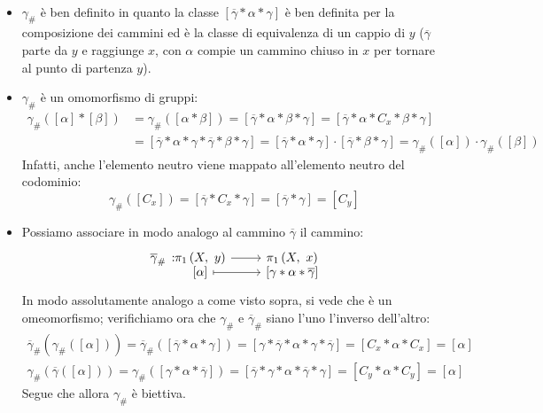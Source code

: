 \begin{demonstration}~{}
	\begin{itemize}
		\item $\gamma_{\#}$ è ben definito in quanto la classe $\left[\overline{\gamma}\ast\alpha\ast\gamma\right]$ è ben definita per la composizione dei cammini ed è la classe di equivalenza di un cappio di $y$ ($\overline{\gamma}$ parte da $y$ e raggiunge $x$, con $\alpha$ compie un cammino chiuso in $x$ per tornare al punto di partenza $y$).
		\item $\gamma_{\#}$ è un omomorfismo di gruppi:
		\begin{equation*}
			\begin{array}{lll}
				\gamma_{\#}\left(\left[\alpha\right]\ast\left[\beta\right]\right)&=\gamma_{\#}\left(\left[\alpha\ast\beta\right]\right)=\left[\overline{\gamma}\ast\alpha\ast\beta\ast\gamma\right]=\left[\overline{\gamma}\ast\alpha\ast C_x\ast\beta\ast\gamma\right]\\
				&=\left[\overline{\gamma}\ast\alpha\ast \gamma\ast\overline{\gamma}\ast\beta\ast\gamma\right]=\left[\overline{\gamma}\ast\alpha\ast\gamma\right]\cdot\left[\overline{\gamma}\ast\beta\ast\gamma\right]=\gamma_{\#}\left(\left[\alpha\right]\right)\cdot \gamma_{\#}\left(\left[\beta\right]\right)
			\end{array}
		\end{equation*}
	Infatti, anche l'elemento neutro viene mappato all'elemento neutro del codominio:
	\begin{equation*}
		\gamma_{\#}\left(\left[C_x\right]\right)=\left[\overline{\gamma}\ast C_x\ast\gamma\right]=\left[\overline{\gamma}\ast\gamma\right]=\left[C_y\right]
	\end{equation*}
	\item Possiamo associare in modo analogo al cammino $\overline{\gamma}$ il cammino:
	\begin{equation*}
		\funztot{\overline{\gamma}_{\#}}{\gruf{X}{y}}{\gruf{X}{x}}{\left[\alpha\right]}{\left[\gamma\ast\alpha\ast\overline{\gamma}\right]}
	\end{equation*}
In modo assolutamente analogo a come visto sopra, si vede che è un omeomorfismo; verifichiamo ora che $\gamma_{\#}$ e $\overline{\gamma}_{\#}$ siano l'uno l'inverso dell'altro:
\begin{gather*}
	\overline{\gamma}_{\#}\left(\gamma_{\#}\left(\left[\alpha\right]\right)\right)=\overline{\gamma}_{\#}\left(\left[\overline{\gamma}\ast\alpha\ast\gamma\right]\right)=\left[\gamma\ast\overline{\gamma}\ast\alpha\ast\gamma\ast\overline{\gamma}\right]=\left[C_x\ast\alpha\ast C_x\right]=\left[\alpha\right]\\
	\gamma_{\#}\left(\overline{\gamma}\left(\left[\alpha\right]\right)\right)=
	\gamma_{\#}\left(\left[\gamma\ast\alpha\ast\overline{\gamma}\right]\right)=\left[\overline{\gamma}\ast\gamma\ast\alpha\ast\overline{\gamma}\ast\gamma\right]=\left[C_y\ast\alpha\ast C_y\right]=\left[\alpha\right]
\end{gather*}
Segue che allora $\gamma_{\#}$ è biettiva.
\end{itemize}
\vspace{-3mm}
\end{demonstration}

